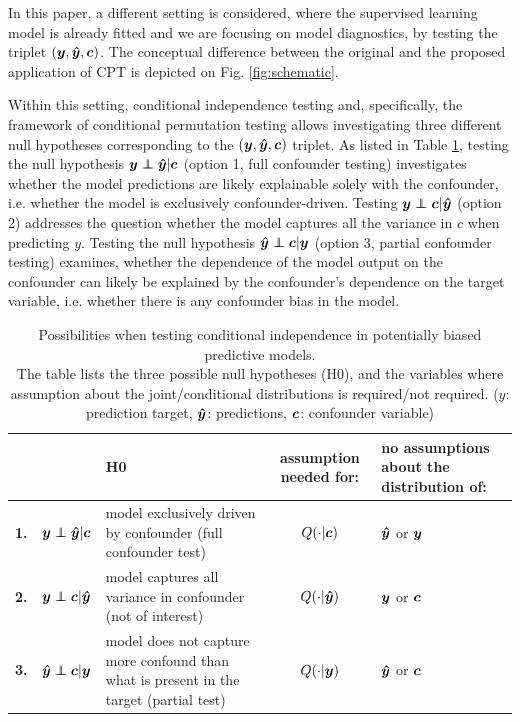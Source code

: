 \documentclass{article}
\begin{document}
In this paper, a different setting is considered, where the supervised learning model is already fitted and we are focusing on model diagnostics, by testing the triplet $(\boldsymbol{y},\boldsymbol{\hat{y}}, \boldsymbol{c})$. The conceptual difference between the original and the proposed application of CPT is depicted on Fig. \ref{fig:schematic}.

Within this setting, conditional independence testing and, specifically, the framework of conditional permutation testing allows investigating three different null hypotheses corresponding to the $(\boldsymbol{y}, \boldsymbol{\hat{y}}, \boldsymbol{c})$ triplet. As listed in Table \ref{tab:conditional-independence-cases}, testing the null hypothesis $\y \independent \yhat | \c$ (option 1, full confounder testing) investigates whether the model predictions are likely explainable solely with the confounder, i.e. whether the model is exclusively confounder-driven. Testing $\y \independent \c | \yhat$ (option 2) addresses the question whether the model captures all the variance in $c$ when predicting $y$. Testing the null hypothesis $\yhat \independent \c | \y$ (option 3, partial confounder testing) examines, whether the dependence of the model output on the confounder can likely be explained by the confounder's dependence on the target variable, i.e. whether there is any confounder bias in the model.

\renewcommand{\arraystretch}{1.2}
\begin{table}[]
\centering
\begin{tabular}{l|rp{60mm}|c|>{\centering\arraybackslash}m{30mm}}
 &  & H0  & assumption needed for: & no assumptions about the distribution of: \\
\hline
\textbf{1.} & $\y \independent \yhat | \c$ \quad  & model exclusively driven by confounder (full confounder test) & $Q(\cdot|\boldsymbol{c})$ & $\boldsymbol{\hat{y}}$ or $\boldsymbol{y}$ \\
\textbf{2.} & $\y \independent \c | \yhat$ \quad & model captures all variance in confounder (not of interest) & $Q(\cdot|\boldsymbol{\hat{y}})$ & $\boldsymbol{y}$ or $\boldsymbol{c}$ \\
\textbf{3.} & $\yhat \independent \c | \y$  \quad &  model does not capture more confound than what is present in the target (partial test) & $Q(\cdot|\boldsymbol{y})$ & $\boldsymbol{\hat{y}}$ or $\boldsymbol{c}$ \\
\end{tabular}
\caption{\label{tab:conditional-independence-cases} Possibilities when testing conditional independence in potentially biased predictive models. \\The table lists the three possible null hypotheses (H0), and the variables where assumption about the joint/conditional distributions is required/not required.   ($y$: prediction target, $\boldsymbol{\hat{y}}$: predictions, $\boldsymbol{c}$: confounder variable) }
\end{table}
\end{document}
